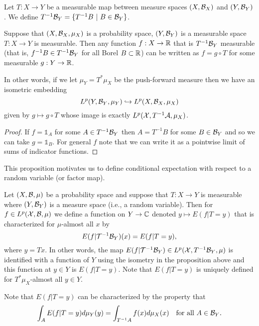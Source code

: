 \documentclass[twoside, a4paper, 10pt]{amsart}
\begin{document}
\begin{mydef} Let $T:X \to Y$ be a measurable map between measure spaces $(X,\mathcal{B}_X)$ and $(Y,\mathcal{B}_Y)$. We define $T^{-1}\mathcal{B}_Y = \{ T^{-1}B ~|~ B \in \mathcal{B}_Y\}$.

\end{mydef}

\begin{prop} Suppose that $(X,\mathcal{B}_X, \mu_X)$ is a probability space, $(Y,\mathcal{B}_Y)$ is a measurable space $T:X \to Y$ is measurable. Then any function $f:X \to \mathbb{R}$ that is $T^{-1}\mathcal{B}_Y$ measurable (that is, $f^{-1}B \in T^{-1}\mathcal{B}_Y$ for all Borel $B \subset \mathbb{R}$) can be written as $f = g \circ T$ for some measurable $g:Y \to \mathbb{R}$. 

In other words, if we let $\mu_Y = T^* \mu_X$ be the push-forward measure then we have an isometric embedding $$L^p(Y, \mathcal{B}_Y, \mu_Y) \hookrightarrow L^p(X,\mathcal{B}_X, \mu_X)$$ given by $g \mapsto g \circ T$ whose image is exactly $L^p(\mathcal{X}, T^{-1}\mathcal{A}, \mu_X)$.
\end{prop}

\begin{proof} If $f = \mathds{1}_A$ for some $A \in T^{-1}\mathcal{B}_Y$ then $A = T^{-1}B$ for some $B \in \mathcal{B}_Y$ and so we can take $g = \mathds{1}_B$. For general $f$ note that we can write it as a pointwise limit of sums of indicator functions. \end{proof}

This proposition motivates us to define conditional expectation with respect to a random variable (or factor map). 

\begin{mydef} Let $(X, \mathcal{B}, \mu)$ be a probability space and suppose that $T:X \to Y$ is measurable where $(Y, \mathcal{B}_Y)$ is a measure space (i.e., a random variable). Then for $f \in L^p(\mathcal{X},\mathcal{B},\mu)$ we define a function on $Y \to \mathbb{C}$ denoted $y \mapsto E(f| T=y)$ that is characterized for $\mu$-almost all $x$ by  $$E(f|\mathcal{T}^{-1}\mathcal{B}_Y)(x) = E(f| T=y),$$ where $y = Tx$. In other words, the map $E(f|\mathcal{T}^{-1}\mathcal{B}_Y) \in L^p(\mathcal{X},T^{-1}\mathcal{B}_Y,\mu)$ is identified with a function of $Y$ using the isometry in the proposition above and this function at $y \in Y$ is  $E(f| T=y)$. Note that $E(f|T=y)$ is uniquely defined for $T^*\mu_X$-almost all $y \in Y$.

\end{mydef}

Note that $E(f|T=y)$ can be characterized by the property that $$\int_A E(f|T=y) d\mu_Y(y) = \int_{T^{-1}A} f(x) d\mu_X(x) \quad \text{for all } A \in \mathcal{B}_Y.$$ 
\end{document}
